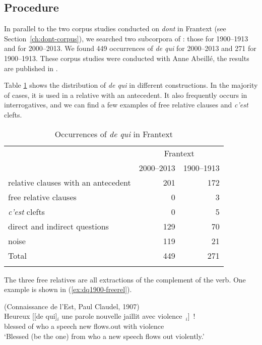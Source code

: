 \subsection{Procedure}

In parallel to the two corpus studies conducted on \emph{dont} in Frantext (see Section~\ref{ch:dont-corpus}), we searched two subcorpora of \citep{Frantext}: those for 1900--1913 and for 2000--2013. We found 449 occurrences of \emph{de qui} for 2000--2013 and 271 for 1900--1913. These corpus studies were conducted with Anne Abeillé, the results are published in \citet{Abeille.2020.JFLS}.

Table \ref{tab:dequi-total} shows the distribution of \textit{de qui} in different constructions. In the majority of cases, it is used in a relative with an antecedent. It also frequently occurs in interrogatives, and we can find a few examples of free relative clauses and \emph{c'est} clefts. 

\begin{table}
    \begin{tabular}{lrr}
         \lsptoprule
               & \multicolumn{2}{c}{Frantext}\\\cmidrule(lr){2-3}
               & \multicolumn{1}{c}{2000--2013} & \multicolumn{1}{c}{1900--1913} \\
         \midrule
         relative clauses with an antecedent & 201 & 172 \\
         free relative clauses & 0 & 3 \\
         \emph{c'est} clefts & 0 & 5 \\
         direct and indirect questions & 129 & 70 \\
         noise & 119 & 21 \\
         Total & 449 & 271 \\
         \lspbottomrule
    \end{tabular}
    \caption{Occurrences of \emph{de qui} in Frantext}
    \label{tab:dequi-total}
\end{table}

The three free relatives are all extractions of the complement of the verb. One example is shown in (\ref{ex:dq1900-freerel}).

\ea (Connaissance de l'Est, Paul Claudel, 1907)\\
\gll Heureux [[de qui]$_i$ une parole nouvelle jaillit avec violence~\trace{}$_i$]~!\\
blessed of who a speech new flows.out with violence\\
\glt `Blessed (be the one) from who a new speech flows out violently.'
\label{ex:dq1900-freerel}
\z 

